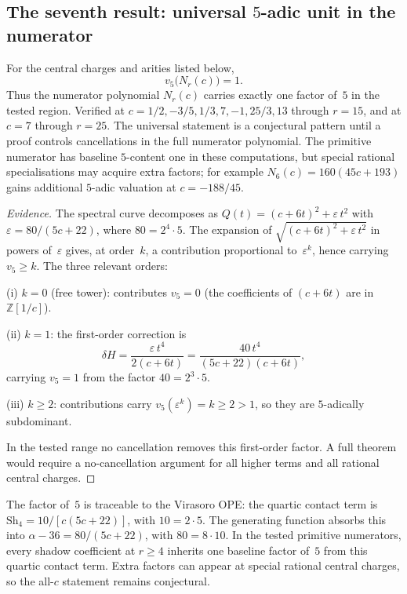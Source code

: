 \documentclass[11pt]{article}
\newcommand{\Z}{\mathbb{Z}}
\begin{document}
\subsection*{The seventh result: universal $5$-adic unit
in the numerator}

\begin{proposition}
\label{thm:universal-5-unit}
For the central charges and arities listed below,
\[
v_5\bigl(N_r(c)\bigr) = 1.
\]
Thus the numerator polynomial $N_r(c)$ carries exactly one
factor of~$5$ in the tested region.  Verified at
$c = 1/2, -3/5, 1/3, 7, -1, 25/3, 13$ through $r = 15$,
and at $c = 7$ through $r = 25$.  The universal statement is a
conjectural pattern until a proof controls cancellations in the
full numerator polynomial.  The primitive numerator has baseline
$5$-content one in these computations, but special rational
specialisations may acquire extra factors; for example
$N_6(c)=160(45c+193)$ gains additional $5$-adic valuation at
$c=-188/45$.
\end{proposition}

\begin{proof}[Evidence]
The spectral curve decomposes as
$Q(t) = (c + 6t)^2 + \varepsilon\,t^2$ with
$\varepsilon = 80/(5c + 22)$, where $80 = 2^4 \cdot 5$.
The expansion of $\sqrt{(c + 6t)^2 + \varepsilon\,t^2}$
in powers of~$\varepsilon$ gives, at order~$k$, a
contribution proportional to~$\varepsilon^k$, hence carrying
$v_5 \ge k$.  The three relevant orders:

\smallskip
\noindent(i) $k = 0$ (free tower): contributes
$v_5 = 0$ (the coefficients of $(c + 6t)$ are in
$\Z[1/c]$).

\noindent(ii) $k = 1$: the first-order correction is
\[
\delta H
= \frac{\varepsilon\,t^4}{2(c + 6t)}
= \frac{40\,t^4}{(5c + 22)(c + 6t)},
\]
carrying $v_5 = 1$ from the factor $40 = 2^3 \cdot 5$.

\noindent(iii) $k \ge 2$: contributions carry
$v_5(\varepsilon^k) = k \ge 2 > 1$, so they are
$5$-adically subdominant.

\smallskip
In the tested range no cancellation removes this first-order
factor.  A full theorem would require a no-cancellation argument
for all higher terms and all rational central charges.
\end{proof}

\begin{remark}
The factor of~$5$ is traceable to the Virasoro OPE: the
quartic contact term is
$\mathrm{Sh}_4 = 10/[c(5c + 22)]$, with
$10 = 2 \cdot 5$.  The generating function absorbs this
into $\alpha - 36 = 80/(5c + 22)$, with
$80 = 8 \cdot 10$.  In the tested primitive numerators, every
shadow coefficient at $r \ge 4$ inherits one baseline factor
of~$5$ from this quartic contact term.  Extra factors can appear
at special rational central charges, so the all-$c$ statement
remains conjectural.
\end{remark}
\end{document}
